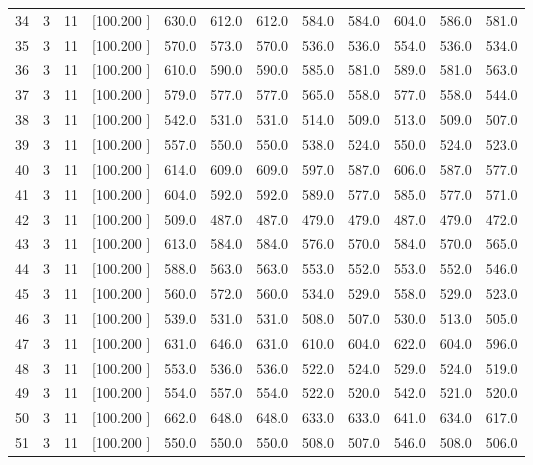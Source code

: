 \documentclass[12pt,a4paper]{article}
\begin{document}
\begin{center}
{\begin{tabular}{r r r r r r r r r r r r}
  34&  3& 11&[100.200   ]&   630.0&   612.0&   612.0&   584.0&   584.0&   604.0&   586.0&   581.0\\[-0.02in]
  35&  3& 11&[100.200   ]&   570.0&   573.0&   570.0&   536.0&   536.0&   554.0&   536.0&   534.0\\[-0.02in]
  36&  3& 11&[100.200   ]&   610.0&   590.0&   590.0&   585.0&   581.0&   589.0&   581.0&   563.0\\[-0.02in]
  37&  3& 11&[100.200   ]&   579.0&   577.0&   577.0&   565.0&   558.0&   577.0&   558.0&   544.0\\[-0.02in]
  38&  3& 11&[100.200   ]&   542.0&   531.0&   531.0&   514.0&   509.0&   513.0&   509.0&   507.0\\[-0.02in]
  39&  3& 11&[100.200   ]&   557.0&   550.0&   550.0&   538.0&   524.0&   550.0&   524.0&   523.0\\[-0.02in]
  40&  3& 11&[100.200   ]&   614.0&   609.0&   609.0&   597.0&   587.0&   606.0&   587.0&   577.0\\[-0.02in]
  41&  3& 11&[100.200   ]&   604.0&   592.0&   592.0&   589.0&   577.0&   585.0&   577.0&   571.0\\[-0.02in]
  42&  3& 11&[100.200   ]&   509.0&   487.0&   487.0&   479.0&   479.0&   487.0&   479.0&   472.0\\[-0.02in]
  43&  3& 11&[100.200   ]&   613.0&   584.0&   584.0&   576.0&   570.0&   584.0&   570.0&   565.0\\[-0.02in]
  44&  3& 11&[100.200   ]&   588.0&   563.0&   563.0&   553.0&   552.0&   553.0&   552.0&   546.0\\[-0.02in]
  45&  3& 11&[100.200   ]&   560.0&   572.0&   560.0&   534.0&   529.0&   558.0&   529.0&   523.0\\[-0.02in]
  46&  3& 11&[100.200   ]&   539.0&   531.0&   531.0&   508.0&   507.0&   530.0&   513.0&   505.0\\[-0.02in]
  47&  3& 11&[100.200   ]&   631.0&   646.0&   631.0&   610.0&   604.0&   622.0&   604.0&   596.0\\[-0.02in]
  48&  3& 11&[100.200   ]&   553.0&   536.0&   536.0&   522.0&   524.0&   529.0&   524.0&   519.0\\[-0.02in]
  49&  3& 11&[100.200   ]&   554.0&   557.0&   554.0&   522.0&   520.0&   542.0&   521.0&   520.0\\[-0.02in]
  50&  3& 11&[100.200   ]&   662.0&   648.0&   648.0&   633.0&   633.0&   641.0&   634.0&   617.0\\[-0.02in]
  51&  3& 11&[100.200   ]&   550.0&   550.0&   550.0&   508.0&   507.0&   546.0&   508.0&   506.0\\[-0.02in]

\end{tabular}}
\end{center}
\end{document}
